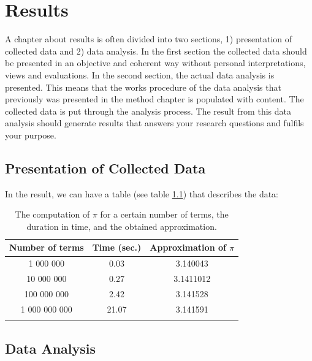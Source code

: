 \documentclass[a4paper, 12pt]{report}
\newcommand{\mytoprule}{\specialrule{0.1em}{0em}{0em}}
\newcommand{\mybottomrule}{\specialrule{0.1em}{0em}{0em}}
\begin{document}




\chapter{Results}
\label{sec:results}

\textcolor{jupurple}{
A chapter about results is often divided into two sections, 1) presentation of collected data and 2) data analysis.
In the first section the collected data should be presented in an objective and coherent way without personal interpretations, views and evaluations.
In the second section, the actual data analysis is presented. This means that the works procedure of the data analysis that previously was presented in the method chapter is populated with content. The collected data is put through the analysis process. The result from this data analysis should generate results that answers your research questions and fulfils your purpose.
}


\section{Presentation of Collected Data}

In the result, we can have a table (see table \ref{tab:termsandpi}) that describes the data:

\begin{table}[ht!]
\centering
\label{tab:termsandpi}
\begin{tabular}{ccc}
\mytoprule
Number of terms & Time (sec.) & Approximation of $\pi$\\
\hline
1 000 000 & 0.03 & 3.140043\\
10 000 000 & 0.27 & 3.1411012\\
100 000 000 & 2.42 & 3.141528\\
1 000 000 000 & 21.07 & 3.141591\\
\mybottomrule
\end{tabular}
\caption{The computation of $\pi$ for a certain number of terms, the duration in time, and the obtained approximation.}
\end{table}

\medskip\lipsum[1]

\section{Data Analysis}
\end{document}
